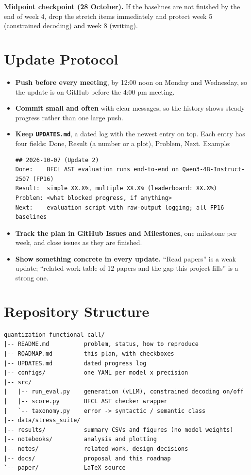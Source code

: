 \documentclass[11pt,a4paper]{article}
\begin{document}
\textbf{Midpoint checkpoint (28 October).} If the baselines are not finished by the end of week 4,
drop the stretch items immediately and protect week 5 (constrained decoding) and week 8 (writing).

\section{Update Protocol}

\begin{itemize}
  \item \textbf{Push before every meeting}, by 12:00 noon on Monday and Wednesday, so the update is
        on GitHub before the 4:00 pm meeting.
  \item \textbf{Commit small and often} with clear messages, so the history shows steady progress
        rather than one large push.
  \item \textbf{Keep \texttt{UPDATES.md}}, a dated log with the newest entry on top. Each entry has
        four fields: Done, Result (a number or a plot), Problem, Next. Example:
\begin{verbatim}
## 2026-10-07 (Update 2)
Done:    BFCL AST evaluation runs end-to-end on Qwen3-4B-Instruct-2507 (FP16)
Result:  simple XX.X%, multiple XX.X% (leaderboard: XX.X%)
Problem: <what blocked progress, if anything>
Next:    evaluation script with raw-output logging; all FP16 baselines
\end{verbatim}
  \item \textbf{Track the plan in GitHub Issues and Milestones}, one milestone per week, and close
        issues as they are finished.
  \item \textbf{Show something concrete in every update.} ``Read papers'' is a weak update;
        ``related-work table of 12 papers and the gap this project fills'' is a strong one.
\end{itemize}

\section{Repository Structure}

\begin{verbatim}
quantization-functional-call/
|-- README.md          problem, status, how to reproduce
|-- ROADMAP.md         this plan, with checkboxes
|-- UPDATES.md         dated progress log
|-- configs/           one YAML per model x precision
|-- src/
|   |-- run_eval.py    generation (vLLM), constrained decoding on/off
|   |-- score.py       BFCL AST checker wrapper
|   `-- taxonomy.py    error -> syntactic / semantic class
|-- data/stress_suite/
|-- results/           summary CSVs and figures (no model weights)
|-- notebooks/         analysis and plotting
|-- notes/             related work, design decisions
|-- docs/              proposal and this roadmap
`-- paper/             LaTeX source
\end{verbatim}
\end{document}
